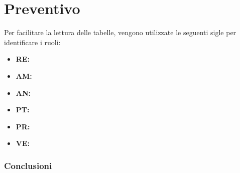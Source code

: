 \section{Preventivo}

Per facilitare la lettura delle tabelle, vengono utilizzate le seguenti sigle per identificare i ruoli:

\begin{itemize}
\item \textbf{RE:} \respProg
\item \textbf{AM:} \ammProg
\item \textbf{AN:} \analProg
\item \textbf{PT:} \progetProg
\item \textbf{PR:} \programProg
\item \textbf{VE:} \verifProg
\end{itemize}







\subsubsection{Conclusioni}
